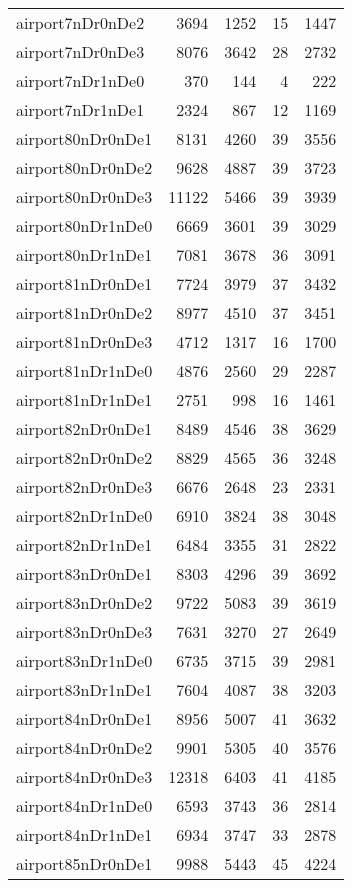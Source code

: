 \begin{longtable}{lrrrr}
airport7nDr0nDe2 & 3694 & 1252 & 15 & 1447 \\
airport7nDr0nDe3 & 8076 & 3642 & 28 & 2732 \\
airport7nDr1nDe0 & 370 & 144 & 4 & 222 \\
airport7nDr1nDe1 & 2324 & 867 & 12 & 1169 \\
airport80nDr0nDe1 & 8131 & 4260 & 39 & 3556 \\
airport80nDr0nDe2 & 9628 & 4887 & 39 & 3723 \\
airport80nDr0nDe3 & 11122 & 5466 & 39 & 3939 \\
airport80nDr1nDe0 & 6669 & 3601 & 39 & 3029 \\
airport80nDr1nDe1 & 7081 & 3678 & 36 & 3091 \\
airport81nDr0nDe1 & 7724 & 3979 & 37 & 3432 \\
airport81nDr0nDe2 & 8977 & 4510 & 37 & 3451 \\
airport81nDr0nDe3 & 4712 & 1317 & 16 & 1700 \\
airport81nDr1nDe0 & 4876 & 2560 & 29 & 2287 \\
airport81nDr1nDe1 & 2751 & 998 & 16 & 1461 \\
airport82nDr0nDe1 & 8489 & 4546 & 38 & 3629 \\
airport82nDr0nDe2 & 8829 & 4565 & 36 & 3248 \\
airport82nDr0nDe3 & 6676 & 2648 & 23 & 2331 \\
airport82nDr1nDe0 & 6910 & 3824 & 38 & 3048 \\
airport82nDr1nDe1 & 6484 & 3355 & 31 & 2822 \\
airport83nDr0nDe1 & 8303 & 4296 & 39 & 3692 \\
airport83nDr0nDe2 & 9722 & 5083 & 39 & 3619 \\
airport83nDr0nDe3 & 7631 & 3270 & 27 & 2649 \\
airport83nDr1nDe0 & 6735 & 3715 & 39 & 2981 \\
airport83nDr1nDe1 & 7604 & 4087 & 38 & 3203 \\
airport84nDr0nDe1 & 8956 & 5007 & 41 & 3632 \\
airport84nDr0nDe2 & 9901 & 5305 & 40 & 3576 \\
airport84nDr0nDe3 & 12318 & 6403 & 41 & 4185 \\
airport84nDr1nDe0 & 6593 & 3743 & 36 & 2814 \\
airport84nDr1nDe1 & 6934 & 3747 & 33 & 2878 \\
airport85nDr0nDe1 & 9988 & 5443 & 45 & 4224 \\

\end{longtable}
